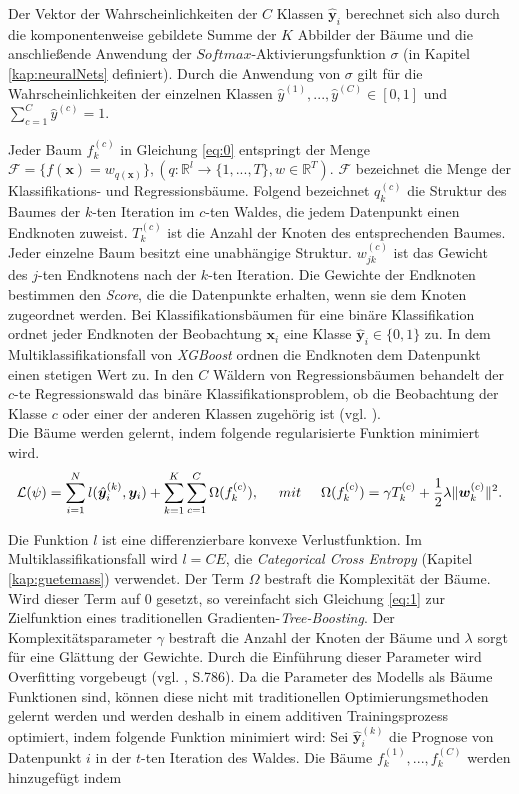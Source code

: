 \documentclass[a4paper,11pt]{article}
\begin{document}
Der Vektor der Wahrscheinlichkeiten der $C$ Klassen $\hat{\bm{y}}_i$ berechnet sich also durch die komponentenweise gebildete Summe der $K$ Abbilder der Bäume und die anschließende Anwendung der $Softmax$-Aktivierungsfunktion $\sigma$ (in Kapitel \ref{kap:neuralNets} definiert). Durch die Anwendung von $\sigma$ gilt für die Wahrscheinlichkeiten der einzelnen Klassen $\hat{y}^{(1)}, ..., \hat{y}^{(C)} \in [0,1]$ und $\sum_{c=1}^C \hat{y}^{(c)} = 1$.

Jeder Baum $f_k^{(c)}$ in Gleichung \ref{eq:0} entspringt der Menge $ \mathcal{F} = \{f(\bm{x}) = w_{q(\bm{x})} \}, (q: \mathbb{R}^l \xrightarrow{} \{1,...,T\}, w \in \mathbb{R}^T)$. $\mathcal{F}$ bezeichnet die Menge der Klassifikations- und Regressionsbäume. Folgend bezeichnet $q_k^{(c)}$ die Struktur des Baumes der $k$-ten Iteration im $c$-ten Waldes, die jedem Datenpunkt einen Endknoten zuweist. $T_k^{(c)}$ ist die Anzahl der Knoten des entsprechenden Baumes. Jeder einzelne Baum besitzt eine unabhängige Struktur. $w_{jk}^{(c)}$ ist das Gewicht des $j$-ten Endknotens nach der $k$-ten Iteration. Die Gewichte der Endknoten bestimmen den \textit{Score}, die die Datenpunkte erhalten, wenn sie dem Knoten zugeordnet werden. Bei Klassifikationsbäumen für eine binäre Klassifikation ordnet jeder Endknoten der Beobachtung $\bm{x}_i$ eine Klasse $\hat{\bm{y}}_i \in \{0,1\}$ zu. In dem Multiklassifikationsfall von \textit{XGBoost} ordnen die Endknoten dem Datenpunkt einen stetigen Wert zu. In den $C$ Wäldern von Regressionsbäumen behandelt der $c$-te Regressionswald das binäre Klassifikationsproblem, ob die Beobachtung der Klasse $c$ oder einer der anderen Klassen zugehörig ist (vgl. \cite{XGBoostR}).\\
Die Bäume werden gelernt, indem folgende regularisierte Funktion minimiert wird.
\begin{equation}\label{eq:1}
   \mathcal{L}(\psi) = \sum_{i=1}^N l(\hat{\bm{y}}_i^{(k)}, \bm{y}_i) + \sum_{k=1}^K \sum_{c=1}^C \Omega(f_k^{(c)}), \hspace{0.5cm} mit \hspace{0.5cm}
\Omega(f_k^{(c)}) = \gamma T_k^{(c)} + \frac{1}{2} \lambda \|\bm{w}_k^{(c)}\|^2 . 
\end{equation}


Die Funktion $l$ ist eine differenzierbare konvexe Verlustfunktion. Im Multiklassifikationsfall wird $l = CE$, die \textit{Categorical Cross Entropy} (Kapitel \ref{kap:guetemass}) verwendet. Der Term $\Omega$ bestraft die Komplexität der Bäume. Wird dieser Term auf $0$ gesetzt, so vereinfacht sich Gleichung \ref{eq:1} zur Zielfunktion eines traditionellen Gradienten-\textit{Tree-Boosting}. Der Komplexitätsparameter $\gamma$ bestraft die Anzahl der Knoten der Bäume und $\lambda$ sorgt für eine Glättung der Gewichte. Durch die Einführung dieser Parameter wird Overfitting vorgebeugt (vgl. \cite{XGBoost}, S.786).
Da die Parameter des Modells als Bäume Funktionen sind, können diese nicht mit traditionellen Optimierungsmethoden gelernt werden und werden deshalb in einem additiven Trainingsprozess optimiert, indem folgende Funktion minimiert wird:
Sei $\hat{\bm{y}}_i^{(k)}$ die Prognose von Datenpunkt $i$ in der $t$-ten Iteration des Waldes. Die Bäume $f_k^{(1)}, ..., f_k^{(C)}$ werden hinzugefügt indem 
\end{document}

